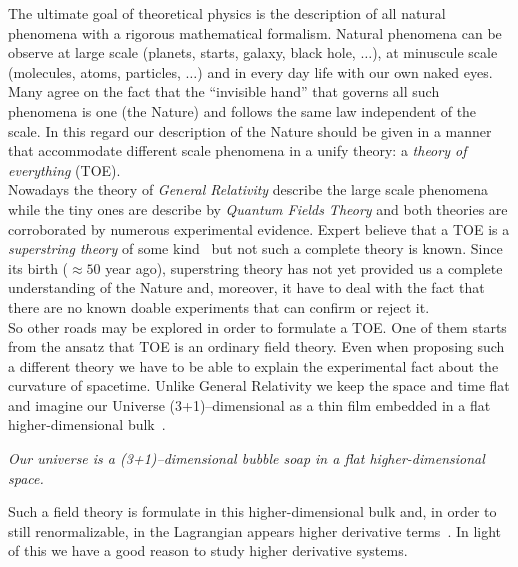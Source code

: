 The ultimate goal of theoretical physics is the description of all natural
phenomena with a rigorous mathematical formalism. Natural phenomena can be
observe at large scale (planets, starts, galaxy, black hole, $\dots$),
at minuscule scale (molecules, atoms, particles, $\dots$) and in every day life
with our own naked eyes. Many agree on the fact that the ``invisible
hand'' that governs all such phenomena is one (the Nature) and follows the
same law independent of the scale. In this regard our description of the Nature
should be given in a manner that accommodate different scale phenomena in a
unify theory: a \emph{theory of everything} (TOE). \\

Nowadays the theory of \emph{General Relativity} describe the large scale
phenomena while the tiny ones are describe by \emph{Quantum Fields Theory} and
both theories are corroborated by numerous experimental evidence. Expert believe
that a TOE is a \emph{superstring theory} of some kind~\cite{Smilga17} but not
such a complete theory is known. Since its birth ($\approx 50$ year ago),
superstring theory has not yet provided us a complete understanding of the
Nature and, moreover, it have to deal with the fact that there are no known
doable experiments that can confirm or reject it. \\

So other roads may be explored in order to formulate a TOE\@. One of them starts
from the ansatz that TOE is an ordinary field theory. Even when proposing such a
different theory we have to be able to explain the experimental fact about the
curvature of spacetime. Unlike General Relativity we keep the space and time
flat and imagine our Universe (3+1)--dimensional as a thin film embedded in a
flat higher-dimensional bulk~\cite{Smilga17}.

\begin{displayquote}
  \emph{Our universe is a (3+1)--dimensional bubble soap in a flat
  higher-dimensional space.}
\end{displayquote}

Such a field theory is formulate in this higher-dimensional bulk and, in order
to still renormalizable, in the Lagrangian appears higher derivative
terms~\cite{Smilga17}. In light of this we have a good reason to study higher
derivative systems.
